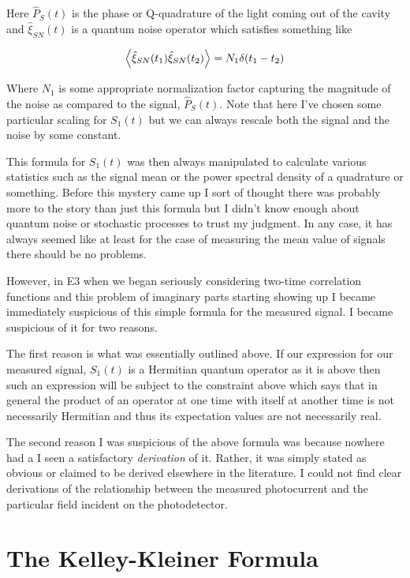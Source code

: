 \documentclass[12pt]{article}
\begin{document}
Here $\hat{P}_S(t)$ is the phase or Q-quadrature of the light coming out of the cavity and $\hat{\xi}_{SN}(t)$ is a quantum noise operator which satisfies something like

\begin{align}
\Braket{\hat{\xi}_{SN}(t_1)\hat{\xi}_{SN}(t_2)} = N_1 \delta(t_1-t_2)
\end{align}

Where $N_1$ is some appropriate normalization factor capturing the magnitude of the noise as compared to the signal, $\hat{P}_S(t)$. Note that here I've chosen some particular scaling for $S_1(t)$ but we can always rescale both the signal and the noise by some constant.

This formula for $S_1(t)$ was then always manipulated to calculate various statistics such as the signal mean or the power spectral density of a quadrature or something. Before this mystery came up I sort of thought there was probably more to the story than just this formula but I didn't know enough about quantum noise or stochastic processes to trust my judgment. In any case, it has always seemed like at least for the case of measuring the mean value of signals there should be no problems.

However, in E3 when we began seriously considering two-time correlation functions and this problem of imaginary parts starting showing up I became immediately suspicious of this simple formula for the measured signal. I became suspicious of it for two reasons. 

The first reason is what was essentially outlined above. If our expression for our measured signal, $S_1(t)$ is a Hermitian quantum operator as it is above then such an expression will be subject to the constraint above which says that in general the product of an operator at one time with itself at another time is not necessarily Hermitian and thus its expectation values are not necessarily real.

The second reason I was suspicious of the above formula was because nowhere had a I seen a satisfactory \textit{derivation} of it. Rather, it was simply stated as obvious or claimed to be derived elsewhere in the literature. I could not find clear derivations of the relationship between the measured photocurrent and the particular field incident on the photodetector.

\section{The Kelley-Kleiner Formula}
\end{document}
